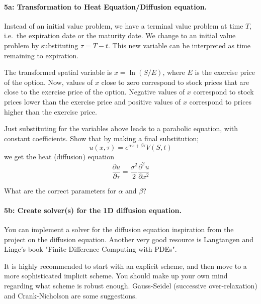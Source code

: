 \documentclass[%
oneside,                 %
final,                   %
10pt]{article}
\begin{document}
\paragraph{5a: Transformation to Heat Equation/Diffusion equation.}
Instead of an initial value problem, we have a terminal value
problem at time $T$, i.e.~the expiration date or the 
maturity date. We change to an initial value problem 
by substituting $\tau = T - t$. This new variable can 
be interpreted as time remaining to expiration.

The transformed spatial variable is $x = \ln(S/E)$, where 
$E$ is the exercise price of the option. Now, values of 
$x$ close to zero correspond to stock prices that are close to 
the exercise price of the option. Negative values of $x$ 
correspond to stock prices lower than the exercise price and 
positive values of $x$ correspond to prices higher than the 
exercise price.

Just substituting for the variables above leads to a parabolic 
equation, with constant coefficients. Show that by making a final
substitution;
\begin{equation}
    u(x, \tau) = e^{\alpha x + \beta \tau} V(S, t)
\end{equation}
we get the heat (diffusion) equation
\begin{equation}
    \frac{\partial u}{\partial \tau}
    = \frac{\sigma^2}{2}\frac{\partial^2 u}{\partial x^2}
\end{equation}

What are the correct parameters for $\alpha$ and $\beta$?




\paragraph{5b: Create solver(s) for the 1D diffusion equation.}
You can implement a solver for the diffusion equation 
inspiration from the project on the diffusion equation.
Another very good resource is Langtangen and Linge's 
book "Finite Difference Computing with PDEs".

It is highly recommended to start with an explicit 
scheme, and then move to a more sophisticated 
implicit scheme. You should make up your 
own mind regarding what scheme is robust enough.
Gauss-Seidel (successive over-relaxation) and
Crank-Nicholson are some suggestions.
\end{document}

